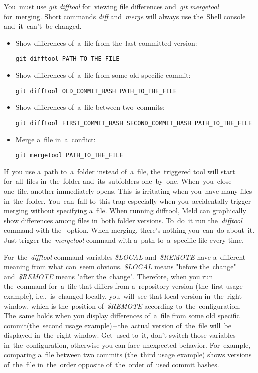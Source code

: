 You~must use \textit{git difftool} for~viewing file differences and~\textit{git mergetool} for~merging.
Short commands \textit{diff} and~\textit{merge} will always use the~Shell console and~it~can't~be changed.

\begin{itemize}
    \item Show differences of~a~file from the~last committed version:
        \begin{lstlisting}[frame=no, gobble=12]
            git difftool PATH_TO_THE_FILE
        \end{lstlisting}
    \item Show differences of~a~file from some old specific commit:
        \begin{lstlisting}[frame=no, gobble=12]
            git difftool OLD_COMMIT_HASH PATH_TO_THE_FILE
        \end{lstlisting}
    \item Show differences of~a~file between two~commits:
        \begin{lstlisting}[frame=no, gobble=12]
            git difftool FIRST_COMMIT_HASH SECOND_COMMIT_HASH PATH_TO_THE_FILE
        \end{lstlisting}
    \item Merge a~file in~a~conflict:
        \begin{lstlisting}[frame=no, gobble=12]
            git mergetool PATH_TO_THE_FILE
        \end{lstlisting}
\end{itemize}

\warningnonl If~you use a~path to~a~folder instead of~a~file, the~triggered tool will start for~all~files in~the~folder and~its~subfolders one~by~one.
When~you~close one~file, another immediately opens.
This~is irritating when you~have many files in~the~folder.
You~can~fall to~this trap especially when you~accidentally trigger merging without specifying a~file.
When running difftool, Meld can graphically show differences among files in~both folder versions.
To~do~it run the~\textit{difftool} command with the~ option.
When merging, there's nothing you~can~do about~it.
Just trigger the~\textit{mergetool} command with a~path to~a~specific file every time.

\warning For~the~\textit{difftool} command variables \textit{\$LOCAL} and~\textit{\$REMOTE} have a~different meaning from what can~seem obvious.
\textit{\$LOCAL} means "before the~change" and~\textit{\$REMOTE} means "after the~change".
Therefore, when you run the~command for~a~file that differs from a~repository version (the~first usage example), i.e.,~is~changed locally, you~will~see that local version in~the~right window, which is the~position of~\textit{\$REMOTE} according to~the~configuration.
The~same holds when you display differences of~a~file from some old specific commit(the~second usage example)\,--\,the~actual version of~the~file will~be displayed in~the~right window.
Get~used to~it, don't switch those variables in~the~configuration, otherwise you can face unexpected behavior.
For~example, comparing a~file between two commits (the~third usage example) shows versions of~the~file in~the~order opposite of~the~order of~used commit hashes.


